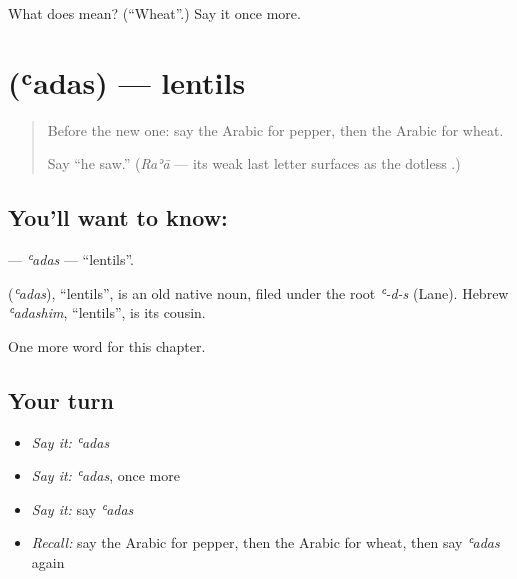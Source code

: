 \begin{tcolorbox}[breakable,colback=teal!4,colframe=teal!35!black,title={Before you move on}]
What does  mean? (\textquotedblleft{}Wheat\textquotedblright{}.) Say it once more.
\end{tcolorbox}
\section[\texorpdfstring{\ar{عدس} (ʿadas)}{عدس (ʿadas)}]{ (ʿadas) — lentils}

\label{lesson:AR-C128-adas}



\begin{quote}
Before the new one: say the Arabic for pepper, then the Arabic for wheat.

Say \textquotedblleft{}he saw.\textquotedblright{} (\emph{Raʾā} — its weak last letter surfaces as the dotless \textbf{}.)
\end{quote}

\subsection*{You'll want to know: }
\textbf{} — \emph{ʿadas} — \textquotedblleft{}lentils\textquotedblright{}.

\begin{cousinweb}
\textbf{} (\emph{ʿadas}), \textquotedblleft{}lentils\textquotedblright{}, is an old native noun, filed under the root \emph{ʿ-d-s} (Lane). Hebrew \emph{ʿadashim}, \textquotedblleft{}lentils\textquotedblright{}, is its cousin.
\end{cousinweb}

\begin{grammarlens}[title={What you've built}]
One more word for this chapter.
\end{grammarlens}

\subsection*{Your turn}
\begin{itemize}
\raggedright
  \item \emph{Say it:} \emph{ʿadas}
  \item \emph{Say it:} \emph{ʿadas}, once more
  \item \emph{Say it:} say \emph{ʿadas}
  \item \emph{Recall:} say the Arabic for pepper, then the Arabic for wheat, then say \emph{ʿadas} again
\end{itemize}

